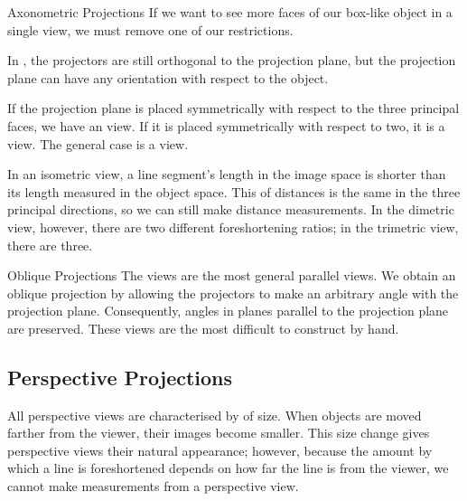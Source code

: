 \documentclass[../COS3712_Notes.tex]{subfiles}
\begin{document}
        \begin{definition}{Axonometric Projections}
          If we want to see more faces of our box-like object in a single view,
          we must remove one of our restrictions.

          In , the projectors are still orthogonal to the
          projection plane, but the projection plane can have any orientation with respect
          to the object.

          If the projection plane is placed symmetrically with respect to the three
          principal faces, we have an  view.
          If it is placed symmetrically with respect to two, it is a  view.
          The general case is a  view.

          In an isometric view, a line segment's length in the image space is shorter
          than its length measured in the object space.
          This  of distances is the same in the three principal directions,
          so we can still make distance measurements.
          In the dimetric view, however, there are two different foreshortening ratios;
          in the trimetric view, there are three.
        \end{definition}

        \begin{definition}{Oblique Projections}
          The  views are the most general parallel views.
          We obtain an oblique projection by allowing the projectors to make
          an arbitrary angle with the projection plane.
          Consequently, angles in planes parallel to the projection plane are preserved.
          These views are the most difficult to construct by hand.
        \end{definition}

      \subsection{Perspective Projections}
        All perspective views are characterised by  of size.
        When objects are moved farther from the viewer, their images become smaller.
        This size change gives perspective views their natural appearance;
        however, because the amount by which a line is foreshortened depends on how far
        the line is from the viewer, we cannot make measurements from a perspective view.
\end{document}
